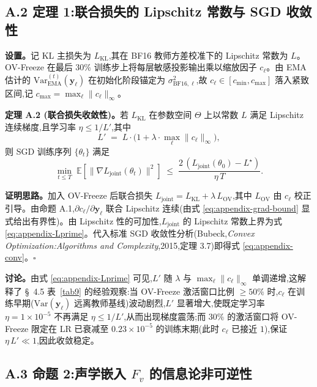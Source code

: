 \documentclass[11pt, a4paper]{article}
\begin{document}
\subsection*{A.2 定理 1:联合损失的 Lipschitz 常数与 SGD 收敛性}

\noindent\textbf{设置。}\quad 记 KL 主损失为 $L_{\mathrm{KL}}$,其在 BF16 教师方差校准下的 Lipschitz 常数为 $L$。OV-Freeze 在最后 $30\%$ 训练步上将每层敏感投影输出乘以缩放因子 $c_\ell$。由 EMA 估计的 $\mathrm{Var}^{(t)}_{\mathrm{EMA}}(\bm{y}_\ell)$ 在初始化阶段锚定为 $\sigma^2_{\mathrm{BF16},\ell}$,故 $c_\ell\in[c_{\min},c_{\max}]$ 落入紧致区间,记 $c_{\max} = \max_\ell\|c_\ell\|_\infty$。

\noindent\textbf{定理 A.2 (联合损失收敛性)。}\quad 若 $L_{\mathrm{KL}}$ 在参数空间 $\Theta$ 上以常数 $L$ 满足 Lipschitz 连续梯度,且学习率 $\eta\le 1/L'$,其中
\begin{equation}
\label{eq:appendix-Lprime}
L' \;=\; L\cdot\bigl(1+\lambda\cdot\max_\ell\|c_\ell\|_\infty\bigr),
\end{equation}
则 SGD 训练序列 $\{\theta_t\}$ 满足
\begin{equation}
\label{eq:appendix-conv}
\min_{t\le T}\;\mathbb{E}\!\left[\|\nabla L_{\mathrm{joint}}(\theta_t)\|^2\right]
\;\le\;
\frac{2\,(L_{\mathrm{joint}}(\theta_0)-L^\star)}{\eta\,T}.
\end{equation}

\noindent\textbf{证明思路。}\quad 加入 OV-Freeze 后联合损失 $L_{\mathrm{joint}}=L_{\mathrm{KL}}+\lambda\,L_{\mathrm{OV}}$,其中 $L_{\mathrm{OV}}$ 由 $c_\ell$ 校正引导。由命题 A.1,$\partial c_\ell/\partial \bm{y}_\ell$ 联合 Lipschitz 连续(由式 \eqref{eq:appendix-grad-bound} 显式给出有界性)。由 Lipschitz 性的可加性,$L_{\mathrm{joint}}$ 的 Lipschitz 常数上界为式 \eqref{eq:appendix-Lprime}。代入标准 SGD 收敛性分析(Bubeck,\textit{Convex Optimization:Algorithms and Complexity},2015,定理 3.7)即得式 \eqref{eq:appendix-conv}。\hfill$\square$

\noindent\textbf{讨论。}\quad 由式 \eqref{eq:appendix-Lprime} 可见,$L'$ 随 $\lambda$ 与 $\max_\ell\|c_\ell\|_\infty$ 单调递增,这解释了 \S~4.5 表~\ref{tab9} 的经验观察:当 OV-Freeze 激活窗口比例 $\ge 50\%$ 时,$c_\ell$ 在训练早期($\mathrm{Var}(\bm{y}_\ell)$ 远离教师基线)波动剧烈,$L'$ 显著增大,使既定学习率 $\eta=1\times10^{-5}$ 不再满足 $\eta\le 1/L'$,从而出现梯度震荡;而 $30\%$ 的激活窗口将 OV-Freeze 限定在 LR 已衰减至 $0.23\times10^{-5}$ 的训练末期(此时 $c_\ell$ 已接近 $1$),保证 $\eta\,L'\ll 1$,因此收敛稳定。

\subsection*{A.3 命题 2:声学嵌入 $F_v$ 的信息论非可逆性}
\end{document}
